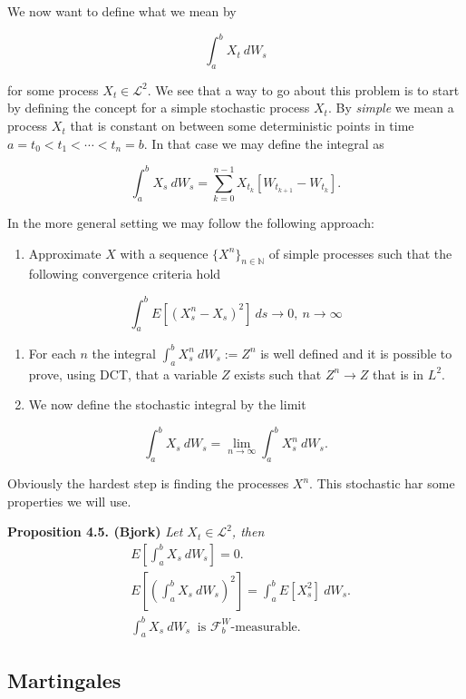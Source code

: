 \documentclass[
]{book}
\providecommand{\tightlist}{%
  \setlength{\itemsep}{0pt}\setlength{\parskip}{0pt}}
\begin{document}
We now want to define what we mean by

\[
\int_a^bX_t\ dW_s
\]

for some process \(X_t\in\mathcal{L}^2\). We see that a way to go about this problem is to start by defining the concept for a simple stochastic process \(X_t\). By \emph{simple} we mean a process \(X_t\) that is constant on between some deterministic points in time \(a=t_0<t_1<\cdots<t_n=b\). In that case we may define the integral as

\[
\int_a^bX_s\ dW_s = \sum_{k=0}^{n-1}X_{t_k}[W_{t_{k+1}}-W_{t_k}].\tag{4.8}
\]

In the more general setting we may follow the following approach:

\begin{enumerate}
\def\labelenumi{\arabic{enumi}.}
\tightlist
\item
  Approximate \(X\) with a sequence \(\{X^n\}_{n\in\mathbb{N}}\) of simple processes such that the following convergence criteria hold
\end{enumerate}

\[
  \int_a^bE[(X_s^n-X_s)^2]\ ds\to 0,\ n\to\infty
  \]

\begin{enumerate}
\def\labelenumi{\arabic{enumi}.}
\setcounter{enumi}{1}
\tightlist
\item
  For each \(n\) the integral \(\int_a^b X_s^n\ dW_s:=Z^n\) is well defined and it is possible to prove, using DCT, that a variable \(Z\) exists such that \(Z^n\to Z\) that is in \(L^2\).
\item
  We now define the stochastic integral by the limit
\end{enumerate}

\[
  \int_a^b X_s\ dW_s=\lim_{n\to \infty}\int_a^b X_s^n\ dW_s.\tag{4.9}
  \]

Obviously the hardest step is finding the processes \(X^n\). This stochastic har some properties we will use.

\textbf{Proposition 4.5. (Bjork)} \emph{Let \(X_t\in\mathcal{L}^2\), then}
\begin{align*}
&E\left[\int_a^b X_s\ dW_s\right]=0.\tag{4.12}\\
&E\left[\left(\int_a^b X_s\ dW_s\right)^2\right]=\int_a^b E[ X_s^2]\ dW_s.\tag{4.13}\\
&\int_a^b X_s\ dW_s\ \text{ is }\mathcal{F}_b^W\text{-measurable.}\tag{4.14}
\end{align*}

\hypertarget{martingales}{%
\subsection{Martingales}\label{martingales}}
\end{document}
